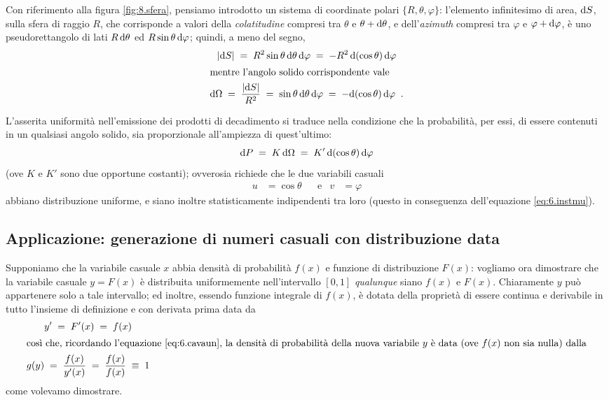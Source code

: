 Con riferimento alla figura \ref{fig:8.sfera}, pensiamo
introdotto un sistema di coordinate polari $\{ R, \theta,
\varphi \}$: l'elemento infinitesimo di area, $\mathrm{d} S$, sulla
sfera di raggio $R$, che corrisponde a valori della
\emph{colatitudine} compresi tra $\theta$ e $\theta + \mathrm{d}
\theta$, e dell'\emph{azimuth} compresi tra $\varphi$ e
$\varphi + \mathrm{d} \varphi$, \`e uno pseudorettangolo di lati $R
\, \mathrm{d}\theta$ ed $R \sin\theta \, \mathrm{d}\varphi$; quindi, a
meno del segno,
\begin{gather*}
  \left| \mathrm{d} S \right| \; = \; R^2 \sin\theta \,
    \mathrm{d}\theta \, \mathrm{d}\varphi \; = \; - R^2 \,
    \mathrm{d}(\cos\theta) \, \mathrm{d}\varphi \\
  \intertext{mentre l'angolo solido corrispondente
    vale}
  \mathrm{d}\Omega \; = \; \frac{\left| \mathrm{d} S \right|}{R^2} \;
    = \; \sin\theta \, \mathrm{d}\theta \, \mathrm{d}\varphi \; = \;
    - \mathrm{d}(\cos\theta) \, \mathrm{d}\varphi \;\; .
\end{gather*}

L'asserita uniformit\`a nell'emissione dei prodotti di
decadimento si traduce nella condizione che la
probabilit\`a, per essi, di essere contenuti in un qualsiasi
angolo solido, sia proporzionale all'ampiezza di
quest'ultimo:
\begin{equation*}
  \mathrm{d} P \; = \; K \, \mathrm{d} \Omega \; = \; K' \, \mathrm{d} (\cos
  \theta) \, \mathrm{d} \varphi
\end{equation*}
(ove $K$ e $K'$ sono due opportune costanti); ovverosia
richiede che le due variabili casuali
\begin{align*}
  u &= \cos\theta &&\text{e} & v &= \varphi
\end{align*}
abbiano distribuzione uniforme, e siano inoltre
statisticamente indipendenti tra loro (questo in conseguenza
dell'equazione \eqref{eq:6.instmu}).

\subsection{Applicazione: generazione di numeri casuali
  con distribuzione data}%
Supponiamo che la variabile casuale $x$ abbia densit\`a di
probabilit\`a $f(x)$ e funzione di distribuzione%
$F(x)$: vogliamo ora dimostrare che la variabile casuale $y
= F(x)$ \`e distribuita uniformemente nell'intervallo $[ 0,
1 ]$ \emph{qualunque} siano $f(x)$ e $F(x)$.  Chiaramente
$y$ pu\`o appartenere solo a tale intervallo; ed inoltre,
essendo funzione integrale di $f(x)$, \`e dotata della
propriet\`a di essere continua e derivabile in tutto
l'insieme di definizione e con derivata prima data da
\begin{gather*}
  y' \; = \; F'(x) \; = \; f(x) \\
  \intertext{cos\`\i\ che, ricordando l'equazione
    \eqref{eq:6.cavaun}, la densit\`a di probabilit\`a
    della nuova variabile $y$ \`e data (ove $f(x)$ non
    sia nulla) dalla}
  g(y) \; = \; \frac{f(x)}{y'(x)} \; = \;
    \frac{f(x)}{f(x)} \; \equiv \; 1
\end{gather*}
come volevamo dimostrare.%

